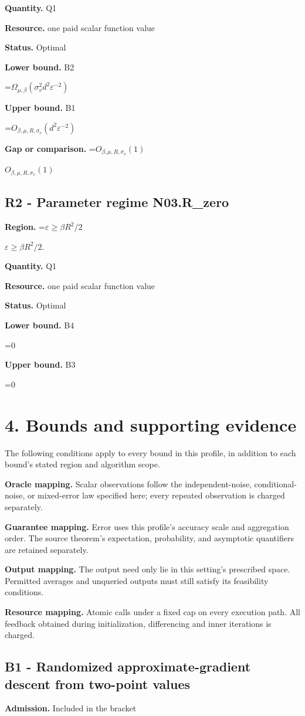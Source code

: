 \documentclass[10pt,a4paper]{article}
\newcommand{\AtlasMath}[1]{\par\begingroup\centering\setbox0=\hbox{$\displaystyle #1$}\ifdim\wd0>1.4\linewidth\typeout{ATLAS WIDE FORMULA: \the\wd0}\fi\ifdim\wd0>\linewidth\resizebox{\linewidth}{!}{\box0}\else\box0\fi\par\endgroup}
\newcommand{\AtlasInlineMath}[1]{\begingroup\setbox0=\hbox{$#1$}\ifdim\wd0>.4\linewidth\endgroup\AtlasMath{#1}\else\endgroup$#1$\fi}
\begin{document}
\textbf{Quantity.} Q1

\textbf{Resource.} one paid scalar function value

\textbf{Status.} Optimal

\textbf{Lower bound.} B2

\AtlasMath{\Omega_{\mu,\beta}(\sigma_v^2d^2\varepsilon^{-2})}
\textbf{Upper bound.} B1

\AtlasMath{O_{\beta,\mu,R,\sigma_v}(d^2\varepsilon^{-2})}
\textbf{Gap or comparison.} \AtlasInlineMath{O_{\beta,\mu,R,\sigma_v}(1)}

\subsection{R2 - Parameter regime N03.R\_zero}
\textbf{Region.} \AtlasInlineMath{\varepsilon\ge\beta R^2/2}.

\textbf{Quantity.} Q1

\textbf{Resource.} one paid scalar function value

\textbf{Status.} Optimal

\textbf{Lower bound.} B4

\AtlasMath{0}
\textbf{Upper bound.} B3

\AtlasMath{0}
\section{4. Bounds and supporting evidence}
The following conditions apply to every bound in this profile, in addition to each bound's stated region and algorithm scope.

\textbf{Oracle mapping.} Scalar observations follow the independent-noise, conditional-noise, or mixed-error law specified here; every repeated observation is charged separately.

\textbf{Guarantee mapping.} Error uses this profile's accuracy scale and aggregation order. The source theorem's expectation, probability, and asymptotic quantifiers are retained separately.

\textbf{Output mapping.} The output need only lie in this setting's prescribed space. Permitted averages and unqueried outputs must still satisfy its feasibility conditions.

\textbf{Resource mapping.} Atomic calls under a fixed cap on every execution path. All feedback obtained during initialization, differencing and inner iterations is charged.

\subsection{B1 - Randomized approximate-gradient descent from two-point values}
\textbf{Admission.} Included in the bracket
\end{document}
